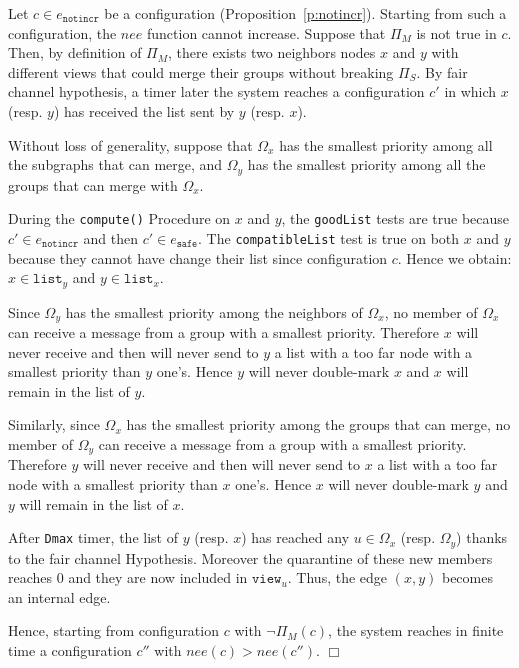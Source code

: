 \documentclass[11pt,english]{article}
\newenvironment{proof}[1][0cm]{
  \begin{list}{\bf Proof.~}{
      \setlength{\itemindent}{0cm}
      \setlength{\labelsep}{0cm}
      \setlength{\labelwidth}{#1}
      \setlength{\leftmargin}{#1}
    \item
    }
}{\hfill$\Box$
  \end{list}
}
\begin{document}
\begin{proof}
  Let $c \in e_\texttt{notincr}$ be a configuration
  (Proposition~\ref{p:notincr}). Starting from such a configuration, the $nee$
  function cannot increase.
Suppose that $\Pi_M$ is not true in $c$. Then, by definition of $\Pi_M$, there
  exists two neighbors nodes $x$ and $y$ with different views that could merge
  their groups without breaking $\Pi_S$. By fair channel hypothesis, a timer
  later the system reaches a configuration $c'$ in which $x$ (resp. $y$) has
  received the list sent by $y$ (resp. $x$).

  Without loss of generality, suppose that $\Omega_x$ has the smallest priority
  among all the subgraphs that can merge, and $\Omega_y$ has the smallest priority
  among all the groups that can merge with $\Omega_x$.

  During the \texttt{compute()} Procedure on $x$ and $y$, the \texttt{goodList}
  tests are true because $c' \in e_\texttt{notincr}$ and then $c' \in
  e_\texttt{safe}$. The \texttt{compatibleList} test is true on both $x$ and $y$
  because they cannot have change their list since configuration $c$. Hence we
  obtain: $x \in \texttt{list}_y$ and $y \in \texttt{list}_x$.

  Since $\Omega_y$ has the smallest priority among the neighbors of $\Omega_x$, no member
  of $\Omega_x$ can receive a message from a group with a smallest
  priority. Therefore $x$ will never receive and then will never send to $y$ a
  list with a too far node with a smallest priority than $y$ one's. Hence $y$
  will never double-mark $x$ and $x$ will remain in the list of $y$.

  Similarly, since $\Omega_x$ has the smallest priority among the groups that can
  merge, no member of $\Omega_y$ can receive a message from a group with a smallest
  priority. Therefore $y$ will never receive and then will never send to $x$ a
  list with a too far node with a smallest priority than $x$ one's. Hence $x$
  will never double-mark $y$ and $y$ will remain in the list of $x$.

  After \texttt{Dmax} timer, the list of $y$ (resp. $x$) has reached any $u \in
  \Omega_x$ (resp. $\Omega_y$) thanks to the fair channel Hypothesis. Moreover the
  quarantine of these new members reaches $0$ and they are now included in
  $\texttt{view}_u$. Thus, the edge $(x,y)$ becomes an internal edge.

  Hence, starting from configuration $c$ with $\neg\Pi_M(c)$, the system reaches
  in finite time a configuration $c''$ with $nee(c) > nee(c'')$.
\end{proof}
\end{document}
